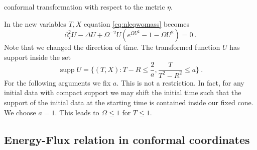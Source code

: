 \documentclass[a4paper]{amsart}
\begin{document}
conformal transformation with respect to the metric $\eta$.
\par
In the new variables $T,X$ equation \eqref{eq:nleqwomass} becomes
\begin{equation}
  {\partial}_T^2 U - \Delta U
  + \Omega^{-2} U (e^{\Omega U^2} - 1 - \Omega U^2) = 0\ .
  \label{eq:equationinconformalcs}
\end{equation}
Note that we changed the direction of time.
The transformed function $U$ has support inside the set
\begin{equation*}
  \operatorname{supp} U
  =
  \{ (T,X): T - R \leq \frac{2}{a},
  \frac{T}{T^2 - R^2} \leq a \} \ .
\end{equation*}
For the following arguments we fix $a$. This is not a restriction. In
fact, for any initial data with compact support we may shift the initial
time such that the support of the initial data at the starting time is
contained inside our fixed cone. We choose $a = 1$. This leads to
$\Omega \leq 1$ for $T \leq 1$.

\subsection{Energy-Flux relation in conformal coordinates}
\end{document}
